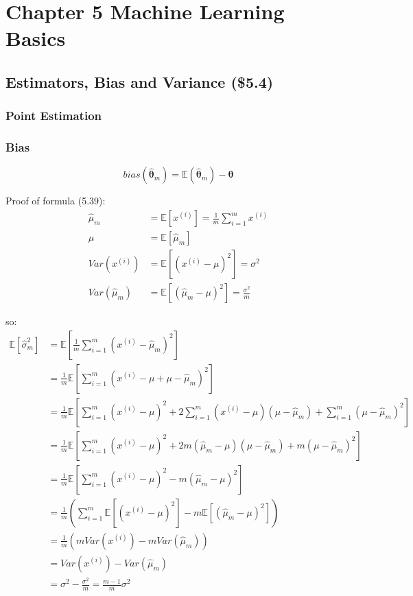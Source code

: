 \documentclass[12pt]{article}
\numberwithin{equation}{section}
\begin{document}
\section{Chapter 5 Machine Learning Basics}
\subsection{Estimators, Bias and Variance (\$5.4)}
\subsubsection{Point Estimation}
\subsubsection{Bias}
\[ bias(\hat{{\boldsymbol\theta}}_m)=\mathbb{E}(\hat{\boldsymbol\theta}_m)-\boldsymbol\theta
\]

Proof of formula (5.39):
\begin{align*}
\hat{\mu}_m&=\mathbb{E}[x^{(i)}]=\frac{1}{m}\sum_{i=1}^{m}x^{(i)} \\
\mu&=\mathbb{E}[\hat{\mu}_m] \\
Var(x^{(i)})&=\mathbb{E}[(x^{(i)}-\mu)^2]=\sigma^2 \\
Var(\hat{\mu}_m)&=\mathbb{E}[(\hat{\mu}_m-\mu)^2] =\frac{\sigma^2}{m}
\end{align*}

so:
\begin{align*}
\mathbb{E}[\hat{\sigma}^2_m]
&=\mathbb{E}[\frac{1}{m}\sum_{i=1}^{m}(x^{(i)}-\hat{\mu}_m)^2] \\
&=\frac{1}{m}\mathbb{E}[\sum_{i=1}^{m}(x^{(i)}-\mu+\mu-\hat{\mu}_m)^2] \\
&=\frac{1}{m}\mathbb{E}[\sum_{i=1}^{m}(x^{(i)}-\mu)^2+2\sum_{i=1}^{m}(x^{(i)}-\mu)(\mu-\hat{\mu}_m)+\sum_{i=1}^{m}(\mu-\hat{\mu}_m)^2] \\
&=\frac{1}{m}\mathbb{E}[\sum_{i=1}^{m}(x^{(i)}-\mu)^2+2m(\hat{\mu}_m-\mu)(\mu-\hat{\mu}_m)+m(\mu-\hat{\mu}_m)^2] \\
&=\frac{1}{m}\mathbb{E}[\sum_{i=1}^{m}(x^{(i)}-\mu)^2-m(\hat{\mu}_m-\mu)^2] \\
&=\frac{1}{m}(\sum_{i=1}^{m}\mathbb{E}[(x^{(i)}-\mu)^2]-m\mathbb{E}[(\hat{\mu}_m-\mu)^2]) \\
&=\frac{1}{m}(mVar(x^{(i)})-mVar(\hat{\mu}_m)) \\
&=Var(x^{(i)})-Var(\hat{\mu}_m) \\
&=\sigma^2-\frac{\sigma^2}{m}=\frac{m-1}{m}\sigma^2
\end{align*}
\end{document}
